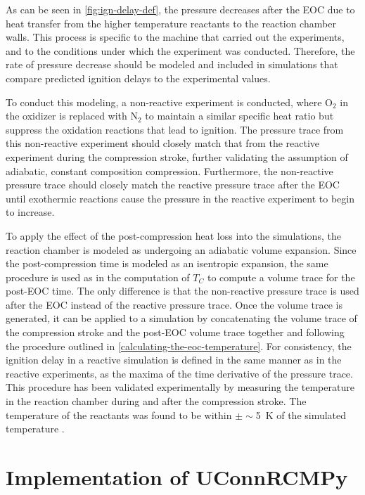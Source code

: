 \documentclass[12pt]{../ussci}
\begin{document}
As can be seen in \cref{fig:ign-delay-def}, the pressure
decreases after the EOC due to heat transfer from the higher temperature
reactants to the reaction chamber walls. This process is specific to the
machine that carried out the experiments, and to the conditions under
which the experiment was conducted. Therefore, the rate of pressure
decrease should be modeled and included in simulations that compare
predicted ignition delays to the experimental values.

To conduct this modeling, a non-reactive experiment is conducted, where
\(\text{O}_2\) in the oxidizer is replaced with \(\text{N}_2\) to
maintain a similar specific heat ratio but suppress the oxidation
reactions that lead to ignition. The pressure trace from this
non-reactive experiment should closely match that from the reactive
experiment during the compression stroke, further validating the
assumption of adiabatic, constant composition compression. Furthermore,
the non-reactive pressure trace should closely match the reactive
pressure trace after the EOC until exothermic reactions cause the
pressure in the reactive experiment to begin to increase.

To apply the effect of the post-compression heat loss into the
simulations, the reaction chamber is modeled as undergoing an adiabatic
volume expansion. Since the post-compression time is modeled as an
isentropic expansion, the same procedure is used as in the computation
of \(T_C\) to compute a volume trace for the post-EOC time. The only
difference is that the non-reactive pressure trace is used after the EOC
instead of the reactive pressure trace. Once the volume trace is
generated, it can be applied to a simulation by concatenating the volume
trace of the compression stroke and the post-EOC volume trace together
and following the procedure outlined in \cref{calculating-the-eoc-temperature}.
For consistency, the ignition delay in a reactive
simulation is defined in the same manner as in the reactive experiments,
as the maxima of the time derivative of the pressure trace. This
procedure has been validated experimentally by measuring the temperature
in the reaction chamber during and after the compression stroke. The
temperature of the reactants was found to be within $\pm\sim $\SI{5}{\K} of the
simulated temperature \autocite{Das2012a,Uddi2012}.

\section{Implementation of
UConnRCMPy}\label{implementation-of-uconnrcmpy}
\end{document}

